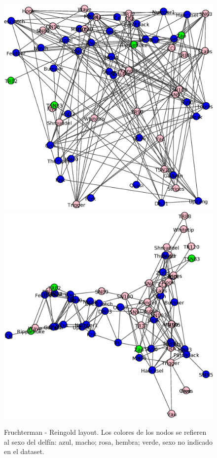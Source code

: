 \begin{figure}[h]
\centering
\includegraphics[scale = 0.25]{figuras/Random}
\includegraphics[scale = 0.25]{figuras/Multi}
\label{fig:Layout_malos}
\caption{Fruchterman - Reingold layout. Los colores de los nodos se refieren al sexo del delfín: azul, macho; rosa, hembra; verde, sexo no indicado en el dataset.}
\end{figure}


